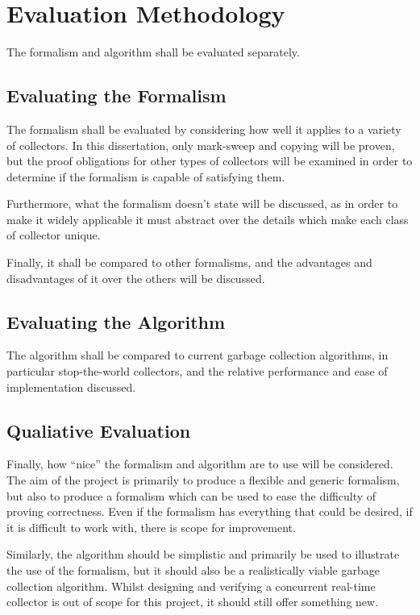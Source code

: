 
\section{Evaluation Methodology}
\label{sec:analysis-evaluation}

The formalism and algorithm shall be evaluated separately.

\subsection{Evaluating the Formalism}
\label{sec:analysis-evaluation-formalism}

The formalism shall be evaluated by considering how well it applies to
a variety of collectors. In this dissertation, only mark-sweep and
copying will be proven, but the proof obligations for other types of
collectors will be examined in order to determine if the formalism is
capable of satisfying them.

Furthermore, what the formalism doesn't state will be discussed, as in
order to make it widely applicable it must abstract over the details
which make each class of collector unique.

Finally, it shall be compared to other formalisms, and the advantages
and disadvantages of it over the others will be discussed.

\subsection{Evaluating the Algorithm}
\label{sec:analysis-evaluation-algorithm}

The algorithm shall be compared to current garbage collection
algorithms, in particular stop-the-world collectors, and the relative
performance and ease of implementation discussed.

\subsection{Qualiative Evaluation}
\label{sec:analysis-evaluation-qualitative}

Finally, how ``nice'' the formalism and algorithm are to use will be
considered. The aim of the project is primarily to produce a flexible
and generic formalism, but also to produce a formalism which can be
used to ease the difficulty of proving correctness. Even if the
formalism has everything that could be desired, if it is difficult to
work with, there is scope for improvement.

Similarly, the algorithm should be simplistic and primarily be used to
illustrate the use of the formalism, but it should also be a
realistically viable garbage collection algorithm. Whilst designing
and verifying a concurrent real-time collector is out of scope for
this project, it should still offer something new.
